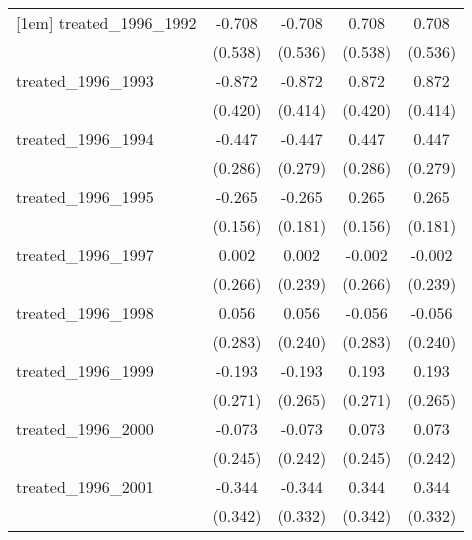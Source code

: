 {\begin{tabular}{l*{4}{c}}
[1em]
treated\_1996\_1992&      -0.708         &      -0.708         &       0.708         &       0.708         \\
            &     (0.538)         &     (0.536)         &     (0.538)         &     (0.536)         \\
[1em]
treated\_1996\_1993&      -0.872\sym{*}  &      -0.872\sym{*}  &       0.872\sym{*}  &       0.872\sym{*}  \\
            &     (0.420)         &     (0.414)         &     (0.420)         &     (0.414)         \\
[1em]
treated\_1996\_1994&      -0.447         &      -0.447         &       0.447         &       0.447         \\
            &     (0.286)         &     (0.279)         &     (0.286)         &     (0.279)         \\
[1em]
treated\_1996\_1995&      -0.265         &      -0.265         &       0.265         &       0.265         \\
            &     (0.156)         &     (0.181)         &     (0.156)         &     (0.181)         \\
[1em]
treated\_1996\_1997&       0.002         &       0.002         &      -0.002         &      -0.002         \\
            &     (0.266)         &     (0.239)         &     (0.266)         &     (0.239)         \\
[1em]
treated\_1996\_1998&       0.056         &       0.056         &      -0.056         &      -0.056         \\
            &     (0.283)         &     (0.240)         &     (0.283)         &     (0.240)         \\
[1em]
treated\_1996\_1999&      -0.193         &      -0.193         &       0.193         &       0.193         \\
            &     (0.271)         &     (0.265)         &     (0.271)         &     (0.265)         \\
[1em]
treated\_1996\_2000&      -0.073         &      -0.073         &       0.073         &       0.073         \\
            &     (0.245)         &     (0.242)         &     (0.245)         &     (0.242)         \\
[1em]
treated\_1996\_2001&      -0.344         &      -0.344         &       0.344         &       0.344         \\
            &     (0.342)         &     (0.332)         &     (0.342)         &     (0.332)         \\

\end{tabular}}
